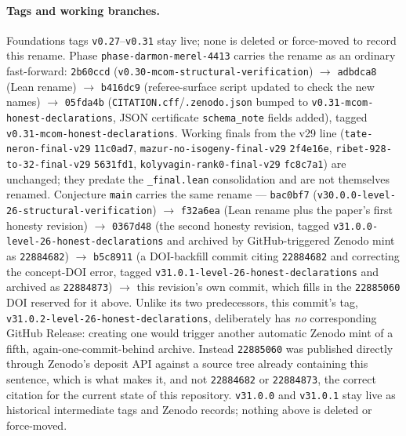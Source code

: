 \paragraph{Tags and working branches.}
Foundations tags \texttt{v0.27}--\texttt{v0.31} stay live; none is
deleted or force-moved to record this rename. Phase
\texttt{phase-darmon-merel-4413} carries the rename as an ordinary
fast-forward: \texttt{2b60ccd} (\texttt{v0.30-mcom-structural-verification})
$\to$ \texttt{adbdca8} (Lean rename) $\to$ \texttt{b416dc9} (referee-surface
script updated to check the new names) $\to$ \texttt{05fda4b}
(\texttt{CITATION.cff}/\texttt{.zenodo.json} bumped to
\texttt{v0.31-mcom-honest-declarations}, JSON certificate
\texttt{schema\_note} fields added), tagged
\texttt{v0.31-mcom-honest-declarations}. Working finals from the v29
line (\texttt{tate-neron-final-v29} \texttt{11c0ad7},
\texttt{mazur-no-isogeny-final-v29} \texttt{2f4e16e},
\texttt{ribet-928-to-32-final-v29} \texttt{5631fd1},
\texttt{kolyvagin-rank0-final-v29} \texttt{fc8c7a1}) are unchanged;
they predate the \texttt{\_final.lean} consolidation and are not
themselves renamed. Conjecture \texttt{main} carries the same rename
--- \texttt{bac0bf7} (\texttt{v30.0.0-level-26-structural-verification})
$\to$ \texttt{f32a6ea} (Lean rename plus the paper's first honesty
revision) $\to$ \texttt{0367d48} (the second honesty revision,
tagged \texttt{v31.0.0-level-26-honest-declarations} and archived by
GitHub-triggered Zenodo mint as \texttt{22884682}) $\to$
\texttt{b5c8911} (a DOI-backfill commit citing \texttt{22884682} and
correcting the concept-DOI error, tagged
\texttt{v31.0.1-level-26-honest-declarations} and archived as
\texttt{22884873}) $\to$ this revision's own commit, which fills in
the \texttt{22885060} DOI reserved for it above. Unlike its two
predecessors, this commit's tag,
\texttt{v31.0.2-level-26-honest-declarations}, deliberately has
\emph{no} corresponding GitHub Release: creating one would trigger
another automatic Zenodo mint of a fifth, again-one-commit-behind
archive. Instead \texttt{22885060} was published directly through
Zenodo's deposit API against a source tree already containing this
sentence, which is what makes it, and not \texttt{22884682} or
\texttt{22884873}, the correct citation for the current state of this
repository. \texttt{v31.0.0} and \texttt{v31.0.1} stay live as
historical intermediate tags and Zenodo records; nothing above is
deleted or force-moved.

